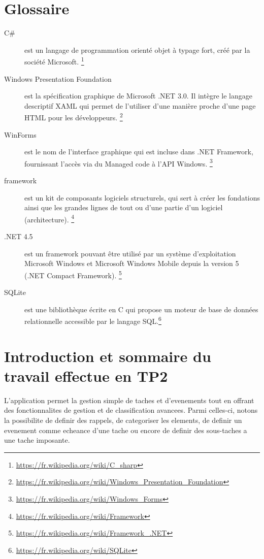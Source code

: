 \documentclass[letterpaper, oneside, 12pt, these, creativecommons]{thETS}
\begin{document}


\tableofcontents
\listoftables
\listoffigures

\chapter{Glossaire}

\begin{description}
\item[C\#] est un langage de programmation orienté objet à typage fort, créé par la société Microsoft. \footnote{\url{https://fr.wikipedia.org/wiki/C_sharp}}
\item[Windows Presentation Foundation] est la spécification graphique de Microsoft .NET 3.0. Il intègre le langage descriptif XAML qui permet de l'utiliser d'une manière proche d'une page HTML pour les développeurs. \footnote{\url{https://fr.wikipedia.org/wiki/Windows_Presentation_Foundation}}
\item[WinForms] est le nom de l'interface graphique qui est incluse dans .NET Framework, fournissant l'accès via du Managed code à l'API Windows. \footnote{\url{https://fr.wikipedia.org/wiki/Windows_Forms}}
\item[framework] est un kit de composants logiciels structurels, qui sert à créer les fondations ainsi que les grandes lignes de tout ou d’une partie d'un logiciel (architecture). \footnote{\url{https://fr.wikipedia.org/wiki/Framework}}
\item[.NET 4.5] est un framework pouvant être utilisé par un système d'exploitation Microsoft Windows et Microsoft Windows Mobile depuis la version 5 (.NET Compact Framework). \footnote{\url{https://fr.wikipedia.org/wiki/Framework_.NET}}
\item[SQLite] est une bibliothèque écrite en C qui propose un moteur de base de données relationnelle accessible par le langage SQL.\footnote{\url{https://fr.wikipedia.org/wiki/SQLite}}
\end{description}

\chapter{Introduction et sommaire du travail effectue en TP2}

L'application permet la gestion simple de taches et d'evenements tout en offrant des fonctionnalites de gestion et de classification avancees. Parmi celles-ci, notons la possibilite de definir des rappels, de categoriser les elements, de definir un evenement comme echeance d'une tache ou encore de definir des sous-taches a une tache imposante.
\end{document}

